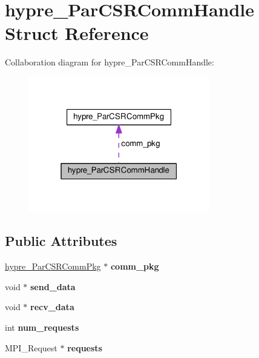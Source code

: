 \hypertarget{structhypre__ParCSRCommHandle}{}\section{hypre\+\_\+\+Par\+C\+S\+R\+Comm\+Handle Struct Reference}
\label{structhypre__ParCSRCommHandle}


Collaboration diagram for hypre\+\_\+\+Par\+C\+S\+R\+Comm\+Handle\+:
\nopagebreak
\begin{figure}[H]
\begin{center}
\leavevmode
\includegraphics[width=223pt]{structhypre__ParCSRCommHandle__coll__graph}
\end{center}
\end{figure}
\subsection*{Public Attributes}
\begin{DoxyCompactItemize}
\item 
\hypertarget{structhypre__ParCSRCommHandle_a1547180836e21a6f930d4ad839e024da}{}\hyperlink{structhypre__ParCSRCommPkg}{hypre\+\_\+\+Par\+C\+S\+R\+Comm\+Pkg} $\ast$ {\bfseries comm\+\_\+pkg}\label{structhypre__ParCSRCommHandle_a1547180836e21a6f930d4ad839e024da}

\item 
\hypertarget{structhypre__ParCSRCommHandle_a41233c26c6b85cfb9874be88d2d24967}{}void $\ast$ {\bfseries send\+\_\+data}\label{structhypre__ParCSRCommHandle_a41233c26c6b85cfb9874be88d2d24967}

\item 
\hypertarget{structhypre__ParCSRCommHandle_a1e6f289ed02929b2ebc131be3c202323}{}void $\ast$ {\bfseries recv\+\_\+data}\label{structhypre__ParCSRCommHandle_a1e6f289ed02929b2ebc131be3c202323}

\item 
\hypertarget{structhypre__ParCSRCommHandle_a627e8c914606b82adeb3b4b5fb0a5b18}{}int {\bfseries num\+\_\+requests}\label{structhypre__ParCSRCommHandle_a627e8c914606b82adeb3b4b5fb0a5b18}

\item 
\hypertarget{structhypre__ParCSRCommHandle_a8d323710c22d9b1ff98ee0e7ec62e784}{}M\+P\+I\+\_\+\+Request $\ast$ {\bfseries requests}\label{structhypre__ParCSRCommHandle_a8d323710c22d9b1ff98ee0e7ec62e784}

\end{DoxyCompactItemize}


